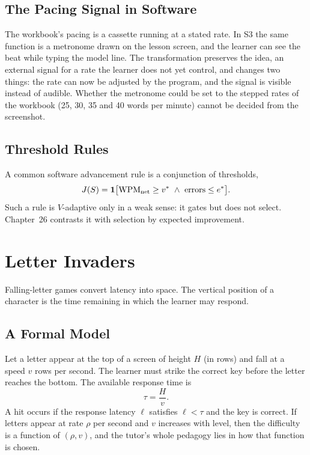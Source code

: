 \section{The Pacing Signal in Software}

The workbook's pacing is a cassette running at a stated rate. In S3 the same function is a metronome drawn on the lesson screen, and the learner can see the beat while typing the model line. The transformation preserves the idea, an external signal for a rate the learner does not yet control, and changes two things: the rate can now be adjusted by the program, and the signal is visible instead of audible. Whether the metronome could be set to the stepped rates of the workbook (25, 30, 35 and 40 words per minute) cannot be decided from the screenshot. 

\section{Threshold Rules}

A common software advancement rule is a conjunction of thresholds,
\[
J(S)=\mathbf 1\bigl[\operatorname{WPM}_{\text{net}}\ge v^{*}\ \wedge\ \text{errors}\le e^{*}\bigr].
\]
Such a rule is $V$-adaptive only in a weak sense: it gates but does not select. Chapter~26 contrasts it with selection by expected improvement.

\chapter{Letter Invaders}

Falling-letter games convert latency into space. The vertical position of a character is the time remaining in which the learner may respond.

\section{A Formal Model}

Let a letter appear at the top of a screen of height $H$ (in rows) and fall at a speed $v$ rows per second. The learner must strike the correct key before the letter reaches the bottom. The available response time is
\[
\tau=\frac{H}{v}.
\]
A hit occurs if the response latency $\ell$ satisfies $\ell<\tau$ and the key is correct. If letters appear at rate $\rho$ per second and $v$ increases with level, then the difficulty is a function of $(\rho,v)$, and the tutor's whole pedagogy lies in how that function is chosen.

